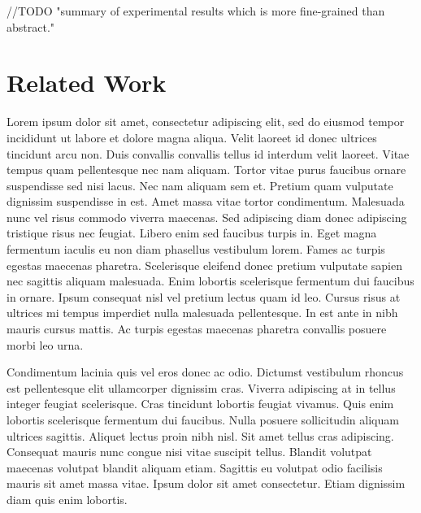 \documentclass[conference]{IEEEtran}
\begin{document}
\par //TODO  "summary of experimental results which is more fine-grained than abstract."

\section{Related Work}
Lorem ipsum dolor sit amet, consectetur adipiscing elit, sed do eiusmod tempor incididunt ut labore et dolore magna aliqua. Velit laoreet id donec ultrices tincidunt arcu non. Duis convallis convallis tellus id interdum velit laoreet. Vitae tempus quam pellentesque nec nam aliquam. Tortor vitae purus faucibus ornare suspendisse sed nisi lacus. Nec nam aliquam sem et. Pretium quam vulputate dignissim suspendisse in est. Amet massa vitae tortor condimentum. Malesuada nunc vel risus commodo viverra maecenas. Sed adipiscing diam donec adipiscing tristique risus nec feugiat. Libero enim sed faucibus turpis in. Eget magna fermentum iaculis eu non diam phasellus vestibulum lorem. Fames ac turpis egestas maecenas pharetra. Scelerisque eleifend donec pretium vulputate sapien nec sagittis aliquam malesuada. Enim lobortis scelerisque fermentum dui faucibus in ornare. Ipsum consequat nisl vel pretium lectus quam id leo. Cursus risus at ultrices mi tempus imperdiet nulla malesuada pellentesque. In est ante in nibh mauris cursus mattis. Ac turpis egestas maecenas pharetra convallis posuere morbi leo urna.

Condimentum lacinia quis vel eros donec ac odio. Dictumst vestibulum rhoncus est pellentesque elit ullamcorper dignissim cras. Viverra adipiscing at in tellus integer feugiat scelerisque. Cras tincidunt lobortis feugiat vivamus. Quis enim lobortis scelerisque fermentum dui faucibus. Nulla posuere sollicitudin aliquam ultrices sagittis. Aliquet lectus proin nibh nisl. Sit amet tellus cras adipiscing. Consequat mauris nunc congue nisi vitae suscipit tellus. Blandit volutpat maecenas volutpat blandit aliquam etiam. Sagittis eu volutpat odio facilisis mauris sit amet massa vitae. Ipsum dolor sit amet consectetur. Etiam dignissim diam quis enim lobortis.
\end{document}
